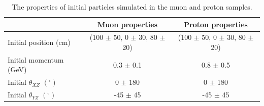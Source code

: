 \begin{table}
\caption{The properties of initial particles simulated in the muon and proton samples.}
\centering
\label{tab:IsolProp}
\begin{tabular}{l c c}
\toprule
{} & {Muon properties} & {Proton properties} \\ 
\midrule
Initial position (cm)              & (100 $\pm$ 50, 0 $\pm$ 30, 80 $\pm$ 20) & (100 $\pm$ 50, 0 $\pm$ 30, 80 $\pm$ 20)  \\

Initial momentum (GeV)            & 0.3 $\pm$ 0.1 & 0.8 $\pm$ 0.5 \\

Initial $\theta_{XZ}$ $(^{\circ})$ &   0 $\pm$ 180 &   0 $\pm$ 180 \\

Initial $\theta_{YZ}$ $(^{\circ})$ & -45 $\pm$ 45  & -45 $\pm$ 45  \\
\bottomrule
\end{tabular}
\end{table}

